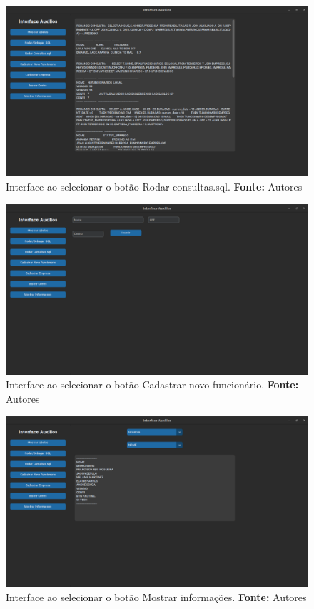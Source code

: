 \begin{figure}[H]
    \centering
    \includegraphics[scale=0.3]{images/consultassql.png}
    \caption{Interface ao selecionar o botão Rodar consultas.sql. \textbf{Fonte:} Autores}
    \label{fig:consultassql}
\end{figure}

\begin{figure}[H]
    \centering
    \includegraphics[scale=0.3]{images/novofunc.png}
    \caption{Interface ao selecionar o botão Cadastrar novo funcionário. \textbf{Fonte:} Autores}
    \label{fig:novofunc}
\end{figure}

\begin{figure}[H]
    \centering
    \includegraphics[scale=0.3]{images/mostrarInfo.png}
    \caption{Interface ao selecionar o botão Mostrar informações. \textbf{Fonte:} Autores}
    \label{fig:mostrarInfo}
\end{figure}

